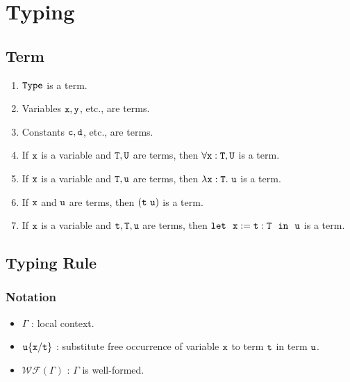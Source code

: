 \section{Typing}

\subsection{Term}

\begin{enumerate}
    \item $\tt Type$ is a term.
    \item Variables $\tt x,y$, etc., are terms.
    \item Constants $\tt c,d$, etc., are terms.
    \item If $\tt x$ is a variable and $\tt T,U$ are terms, then $\tt\forall x:T,U$ is a term.
    \item If $\tt x$ is a variable and $\tt T,u$ are terms, then $\tt\lambda x:T.\ u$ is a term.
    \item If $\tt x$ and $\tt u$ are terms, then $\tt (t\ u)$ is a term.
    \item If $\tt x$ is a variable and $\tt t,T,u$ are terms, then $\tt let\ \ x:=t:T\ \ in\ \ u$ is a term.
\end{enumerate}

\subsection{Typing Rule}

\subsubsection{Notation}
\begin{itemize}
\item $\Gamma$ : local context.
\item $\tt u\{x/t\}$ : substitute free occurrence of variable $\tt x$ to term $\tt t$ in term $\tt u$.
\item $\mathcal{WF}(\Gamma)$ : $\Gamma$ is well-formed.
\end{itemize}

